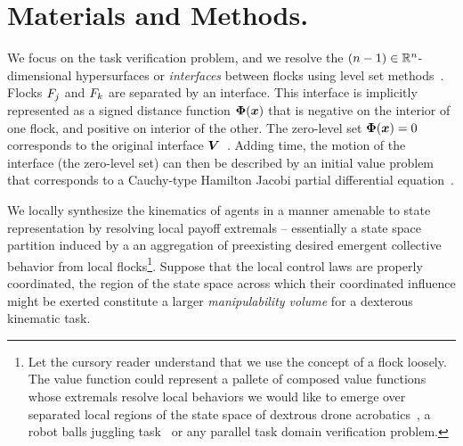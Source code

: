 \section{Materials and Methods.}
\label{sec:methods}
%
We focus on the task verification problem, and we resolve the $(n-1) \in \mathbb{R}^n$-dimensional hypersurfaces  or \textit{interfaces} between flocks using level set methods~\cite{SethianLSBook}. Flocks $F_j$ and $F_k$ are separated by an interface. This interface is  implicitly represented as a  signed distance function $\bm{\Phi}(\bm{x})$ that is negative on the interior of one flock, and positive on interior of the other. The zero-level set $\bm{\Phi}(\bm{x})=0$ corresponds to the original interface $\bm{V}$~\cite{Sethian87Numerical}. Adding time, the motion of the interface (the zero-level set) can then be described by an initial value problem that corresponds to a Cauchy-type Hamilton Jacobi partial differential equation~\cite{Evans1984, Crandall1983viscosity}. 

 
 We locally synthesize the kinematics of agents in a manner amenable to state representation by resolving local payoff extremals -- essentially a state space partition induced by a an aggregation of preexisting desired emergent collective behavior from local flocks\footnote{Let the cursory reader understand that we use the concept of a flock loosely. The value function could represent a pallete of composed value functions whose extremals resolve local behaviors we would like to emerge over separated local regions of the state space of dextrous drone acrobatics~\cite{DeepAcrobatics}, a robot balls juggling task~\cite{SeqCompKoditschek} or any parallel task domain verification problem.}.  Suppose that the local control laws are properly coordinated, the region of the state space across which their coordinated influence might be exerted constitute a larger \eg \textit{manipulability volume} for a dexterous kinematic task. 
 
